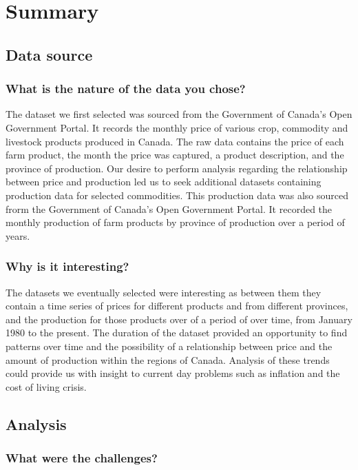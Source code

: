 \section{Summary}

\subsection{Data source}

\subsubsection{What is the nature of the data you chose?}

The dataset we first selected was sourced from the Government of Canada's Open Government Portal.
It records the monthly price of various crop, commodity and livestock products produced in Canada.
The raw data contains the price of each farm product, the month the price was captured, a product description, and the province of production.
Our desire to perform analysis regarding the relationship between price and production led us to seek additional datasets containing production data for selected commodities.
This production data was also sourced frorm the Government of Canada's Open Government Portal.
It recorded the monthly production of farm products by province of production over a period of years.

\subsubsection{Why is it interesting?}

The datasets we eventually selected were interesting as between them they contain a time series of prices for different products and from different provinces, and the production for those products over of a period of over time, from January 1980 to the present.
The duration of the dataset provided an opportunity to find patterns over time and the possibility of a relationship between price and the amount of production within the regions of Canada.
Analysis of these trends could provide us with insight to current day problems such as inflation and the cost of living crisis.

\subsection{Analysis}

\subsubsection{What were the challenges?}


